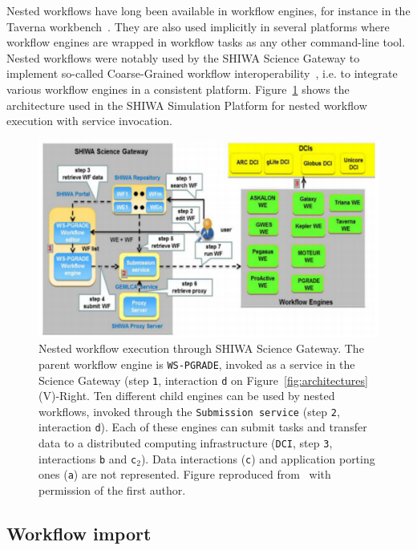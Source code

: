 \documentclass[preprint,3p,twocolumn]{elsarticle}
\begin{document}
Nested workflows have long been available in workflow engines, for
instance in the Taverna workbench~\cite{oinn2004taverna}. They are
also used implicitly in several platforms where workflow engines are
wrapped in workflow tasks as any other command-line tool. Nested
workflows were notably used by the SHIWA Science Gateway to implement
so-called Coarse-Grained workflow
interoperability~\cite{terstyanszky2014enabling}, i.e. to integrate
various workflow engines in a consistent
platform. Figure~\ref{fig:shiwa-architecture} shows the architecture
used in the SHIWA Simulation Platform for nested workflow execution
with service invocation.
\begin{figure}
\centering
\includegraphics[width=1.5\columnwidth]{figures/shiwa-science-gateway.pdf}
\caption{Nested workflow execution through SHIWA Science Gateway. The
  parent workflow engine is \texttt{WS-PGRADE}, invoked as a service
  in the Science Gateway (step \texttt{1}, interaction \texttt{d} on
  Figure~\ref{fig:architectures}(V)-Right. Ten different child engines can be used by nested
  workflows, invoked through the \texttt{Submission service} (step
  \texttt{2}, interaction \texttt{d}). Each of these engines can
  submit tasks and transfer data to a distributed computing
  infrastructure (\texttt{DCI}, step \texttt{3}, interactions
  \texttt{b} and \texttt{c$_2$}). Data interactions (\texttt{c}) and
  application porting ones (\texttt{a}) are not represented. Figure
  reproduced from~\cite{terstyanszky2014enabling} with permission of
  the first author.}
\label{fig:shiwa-architecture}
\end{figure}

\subsection{Workflow import}
\end{document}

